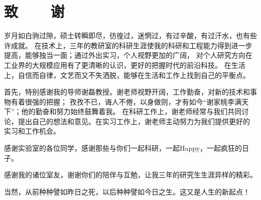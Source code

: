 \chapter*{致~~~~谢}

\vspace{2ex}
岁月如白驹过隙，硕士转瞬即尽，彷徨过，迷惘过，有过辛酸，有过汗水，也有些许成就。
在技术上，三年的教研室的科研生涯使我的科研和工程能力得到进一步提高，能够独当一面；通过外出实习，个人视野更加的广阔，
对个人研究方向在工业界的大规模应用有了更清晰的认识，更好的把握时代的前沿科技。
在生活上，自信而自律，文艺而又不失洒脱，能够在生活和工作上找到自己的平衡点。


首先，特别感谢我的导师谢磊教授。谢老师视野开阔，工作勤奋，对新的技术和事物有着很强的把握；
孜孜不已，诲人不倦，以身做则，才有如今“谢家桃李满天下”；他的勤奋和努力始终鼓舞着我。
在科研工作上，谢老师经常与我们共同讨论，提出自己的想法和意见。在实习工作上，谢老师主动努力为我们提供更好的
实习和工作机会。

感谢实验室的各位同学，感谢那些与你们一起科研，一起Happy，一起疯狂的日子。

感谢我的诸位室友，谢谢你们的陪伴与互勉，让我三年的研究生生涯异样的精彩。

当然，从前种种譬如昨日之死，以后种种譬如今日之生。这又是人生的新起点！


\clearpage
